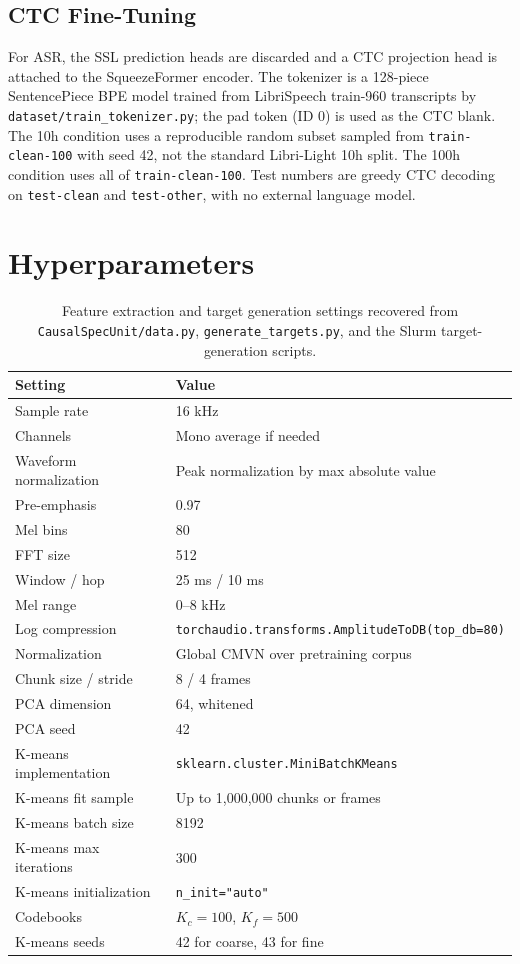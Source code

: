 \documentclass{article}
\newcommand{\code}[1]{\texttt{#1}}
\begin{document}
\subsection{CTC Fine-Tuning}
For ASR, the SSL prediction heads are discarded and a CTC projection head
is attached to the SqueezeFormer encoder. The tokenizer is a 128-piece
SentencePiece BPE model trained from LibriSpeech train-960 transcripts by
\code{dataset/train\_tokenizer.py}; the pad token (ID 0) is used as the CTC
blank. The 10h condition uses a reproducible random subset sampled from
\code{train-clean-100} with seed 42, not the standard Libri-Light 10h
split. The 100h condition uses all of \code{train-clean-100}. Test numbers
are greedy CTC decoding on \code{test-clean} and \code{test-other}, with no
external language model.

\section{Hyperparameters}

\begin{table}[h]
\centering
\small
\caption{Feature extraction and target generation settings recovered from
\code{CausalSpecUnit/data.py}, \code{generate\_targets.py}, and the Slurm
target-generation scripts.}
\begin{tabular}{@{}ll@{}}
\toprule
Setting & Value \\
\midrule
Sample rate & 16 kHz \\
Channels & Mono average if needed \\
Waveform normalization & Peak normalization by max absolute value \\
Pre-emphasis & 0.97 \\
Mel bins & 80 \\
FFT size & 512 \\
Window / hop & 25 ms / 10 ms \\
Mel range & 0--8 kHz \\
Log compression & \code{torchaudio.transforms.AmplitudeToDB(top\_db=80)} \\
Normalization & Global CMVN over pretraining corpus \\
Chunk size / stride & 8 / 4 frames \\
PCA dimension & 64, whitened \\
PCA seed & 42 \\
K-means implementation & \code{sklearn.cluster.MiniBatchKMeans} \\
K-means fit sample & Up to 1,000,000 chunks or frames \\
K-means batch size & 8192 \\
K-means max iterations & 300 \\
K-means initialization & \code{n\_init="auto"} \\
Codebooks & $K_c=100$, $K_f=500$ \\
K-means seeds & 42 for coarse, 43 for fine \\
\bottomrule
\end{tabular}
\end{table}
\end{document}
